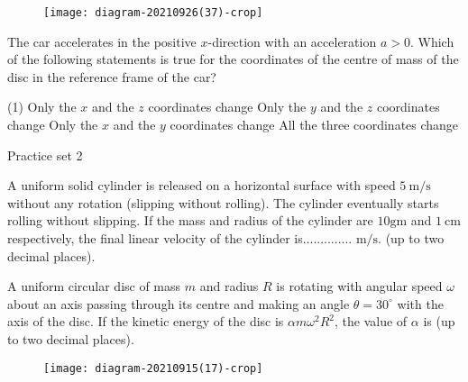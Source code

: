 \begin{enumerate}
\begin{minipage}{\textwidth}
	\begin{figure}[H]
		\centering
		\texttt{[image: diagram-20210926(37)-crop]}
	\end{figure}
	The car accelerates in the positive $x$-direction with an acceleration $a>0 .$ Which of the following statements is true for the coordinates of the centre of mass of the disc in the reference frame of the car?
\end{minipage}
\begin{tasks}(1)
	\task[\textbf{A.}]Only the $x$ and the $z$ coordinates change
	\task[\textbf{B.}]Only the $y$ and the $z$ coordinates change
	\task[\textbf{C.}]Only the $x$ and the $y$ coordinates change
	\task[\textbf{D.}]All the three coordinates change
\end{tasks}
\end{enumerate}


\newpage
\begin{abox}
	Practice set 2
	\end{abox}
\begin{enumerate}
\begin{minipage}{\textwidth}
	\item A uniform solid cylinder is released on a horizontal surface with speed $5 \mathrm{~m} / \mathrm{s}$ without any rotation (slipping without rolling). The cylinder eventually starts rolling without slipping. If the mass and radius of the cylinder are $10 \mathrm{gm}$ and $1 \mathrm{~cm}$ respectively, the final linear velocity of the cylinder is.............. $\mathrm{m} / \mathrm{s}$. (up to two decimal places).
\end{minipage}
\begin{minipage}{\textwidth}
	\item A uniform circular disc of mass $m$ and radius $R$ is rotating with angular speed $\omega$ about an axis passing through its centre and making an angle $\theta=30^{\circ}$ with the axis of the disc. If the kinetic energy of the disc is $\alpha m \omega^{2} R^{2}$, the value of $\alpha$ is (up to two decimal places).
	\begin{figure}[H]
		\centering
		\texttt{[image: diagram-20210915(17)-crop]}
	\end{figure}
\end{minipage}
\end{enumerate}



